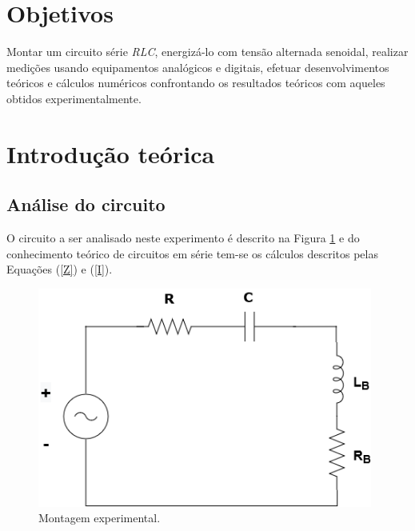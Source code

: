 \documentclass[a4paper,12pt,oneside,openany,table,xcdraw]{article}
\begin{document}
\newcommand{\thedepartment}{Faculdade de Engenharia Elétrica}
\newcommand{\thecourse}{FEELT}
\newcommand{\thetitle}{TENSÕES, CORRENTE E POTÊNCIAS EM CIRCUITO SÉRIE, FATOR DE POTÊNCIA E CORRENTE ALTERNADA SENOIDAL - USO DE MEDIDORES ANALÓGICOS E DIGITAIS}
\newcommand{\thetype}{Relatório da Disciplina de Circuitos Elétricos II}
\newcommand{\theproftitle}{Bacharel em Engenharia Elétrica}
\newcommand{\thestudent}{Lesly Viviane Montúfar Berrios\\
\centering11811ETE001}
\newcommand{\theadvisor}{Prof. Wellington Maycon Santos Bernardes}
\newcommand{\thecity}{Uberlândia}

\thispagestyle{empty}


\onehalfspacing
\tableofcontents %
\newpage

\section{Objetivos} %
Montar um circuito série \emph{RLC}, energizá-lo com tensão alternada senoidal, realizar medições usando
equipamentos analógicos e digitais, efetuar desenvolvimentos teóricos e cálculos numéricos confrontando os
resultados teóricos com aqueles obtidos experimentalmente.

\section{Introdução teórica} %

\subsection{Análise do circuito}
O circuito a ser analisado neste experimento é descrito na Figura \ref{circuito} e do conhecimento teórico de circuitos em série tem-se os cálculos descritos pelas Equações (\ref{Z}) e (\ref{I}).

\begin{figure}[H]
\centering
\captionsetup{font=scriptsize}
\includegraphics[width=11cm]{circuito}
\caption{Montagem experimental.}
\label{circuito}
\end{figure}
\end{document}
